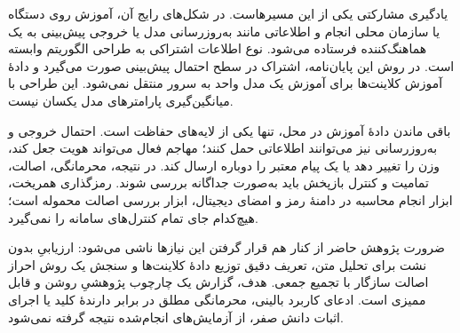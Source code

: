 یادگیری مشارکتی یکی از این مسیرهاست. در شکل‌های رایج آن، آموزش روی دستگاه یا سازمان محلی انجام و اطلاعاتی مانند به‌روزرسانی مدل یا خروجی پیش‌بینی به یک هماهنگ‌کننده فرستاده می‌شود. نوع اطلاعات اشتراکی به طراحی الگوریتم وابسته است. در روش این پایان‌نامه، اشتراک در سطح احتمال پیش‌بینی صورت می‌گیرد و دادۀ آموزش کلاینت‌ها برای آموزش یک مدل واحد به سرور منتقل نمی‌شود. این طراحی با میانگین‌گیری پارامترهای مدل یکسان نیست.

باقی ماندن دادۀ آموزش در محل، تنها یکی از لایه‌های حفاظت است. احتمال خروجی و به‌روزرسانی نیز می‌توانند اطلاعاتی حمل کنند؛ مهاجم فعال می‌تواند هویت جعل کند، وزن را تغییر دهد یا یک پیام معتبر را دوباره ارسال کند. در نتیجه، محرمانگی، اصالت، تمامیت و کنترل بازپخش باید به‌صورت جداگانه بررسی شوند. رمزگذاری همریخت، ابزار انجام محاسبه در دامنۀ رمز و امضای دیجیتال، ابزار بررسی اصالت محموله است؛ هیچ‌کدام جای تمام کنترل‌های سامانه را نمی‌گیرد.

ضرورت پژوهش حاضر از کنار هم قرار گرفتن این نیازها ناشی می‌شود: ارزیابیِ بدون نشت برای تحلیل متن، تعریف دقیق توزیع دادۀ کلاینت‌ها و سنجش یک روش احراز اصالت سازگار با تجمیع جمعی. هدف، گزارش یک چارچوب پژوهشیِ روشن و قابل ممیزی است. ادعای کاربرد بالینی، محرمانگی مطلق در برابر دارندۀ کلید یا اجرای اثبات دانش صفر، از آزمایش‌های انجام‌شده نتیجه گرفته نمی‌شود.
